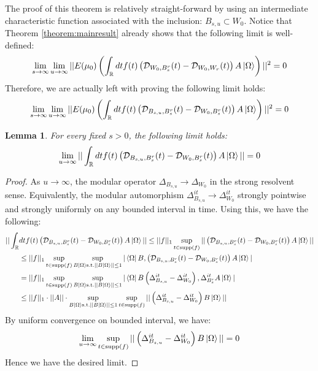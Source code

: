 \documentclass[a4paper,11pt]{article}
\newtheorem{lemma}[theorem]{Lemma}
\theoremstyle{definition}
\newcommand{\lb}{\left(}
\newcommand{\rb}{\right)}
\begin{document}
The proof of this theorem is relatively straight-forward by using an intermediate characteristic function associated with the inclusion: $B_{s,u}\subset W_0$. Notice that Theorem \ref{theorem:mainresult} already shows that the following limit is well-defined:
\begin{equation}
    \lim_{s\rightarrow\infty}\lim_{u\rightarrow\infty}||E(\mu_0)\lb\int_\mathbb{R} dt f(t)\lb \mathcal{D}_{W_0, B^r_s}(t) - \mathcal{D}_{W_0, W_r}(t) \rb A\ket{\Omega}\rb||^2 = 0
\end{equation}
Therefore, we are actually left with proving the following limit holds:
\begin{equation}
    \lim_{s\rightarrow\infty}\lim_{u\rightarrow\infty}||E(\mu_0)\lb\int_\mathbb{R} dt f(t)\lb \mathcal{D}_{B_{s,u}, B^r_s}(t) - \mathcal{D}_{W_0, B^r_s}(t) \rb A\ket{\Omega}\rb||^2 = 0
\end{equation}
\begin{lemma}
    For every fixed $s > 0$, the following limit holds:
    \begin{equation}
        \lim_{u\rightarrow\infty}||\int_\mathbb{R} dt f(t)\lb\mathcal{D}_{B_{s,u}, B^r_s}(t) - \mathcal{D}_{W_0, B^r_s}(t)\rb A\ket{\Omega}|| = 0
    \end{equation}
\end{lemma}
\begin{proof}
    As $u\rightarrow\infty$, the modular operator $\Delta_{B_{s,u}}\rightarrow \Delta_{W_0}$ in the strong resolvent sense\cite{takesaki2}. Equivalently, the modular automorphism $\Delta_{B_{s,u}}^{it}\rightarrow\Delta_{W_0}^{it}$ strongly pointwise and strongly uniformly on any bounded interval in time. Using this, we have the following:
    \begin{align}
        \begin{split}
            ||\int_\mathbb{R}& dt f(t) \lb\mathcal{D}_{B_{s,u},B^r_s}(t) - \mathcal{D}_{W_0, B^r_s}(t)\rb A\ket{\Omega}|| \leq ||f||_1\sup_{t\in\text{supp}(f)}||\lb\mathcal{D}_{B_{s,u},B^r_s}(t) - \mathcal{D}_{W_0, B^r_s}(t)\rb A\ket{\Omega}||
            \\
            &\leq ||f||_1\sup_{t\in\text{supp}(f)}\sup_{B\ket{\Omega}\text{s.t.}||B\ket{\Omega}||\leq 1}|\bra{\Omega}B, \lb\mathcal{D}_{B_{s,u}, B^r_s}(t) - \mathcal{D}_{W_0, B^r_s}(t)\rb A\ket{\Omega}|
            \\&
            =||f||_1\sup_{t\in\text{supp}(f)}\sup_{B\ket{\Omega}\text{s.t.}||B\ket{\Omega}||\leq 1}|\bra{\Omega}B\lb\Delta^{it}_{B_{s,u}}- \Delta^{it}_{W_0}\rb, \Delta^{it}_{B_s^r}A\ket{\Omega}|
            \\&
            \leq||f||_1\cdot||A||\cdot\sup_{B\ket{\Omega}\text{s.t.}||B\ket{\Omega}||\leq 1}\sup_{t\in\text{supp}(f)}||\lb\Delta^{it}_{B_{s,u}} - \Delta^{it}_{W_0}\rb B\ket{\Omega}||
        \end{split}
    \end{align}
    By uniform convergence on bounded interval, we have:
    \begin{equation}
        \lim_{u\rightarrow\infty}\sup_{t\in\text{supp}(f)}||\lb\Delta^{it}_{B_{s,u}} - \Delta^{it}_{W_0}\rb B\ket{\Omega}|| = 0
    \end{equation}
    Hence we have the desired limit.\qedhere
\end{proof}
\end{document}
